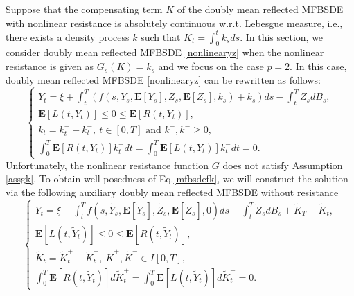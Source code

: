 \documentclass[10pt]{article}%
\numberwithin{equation}{section}
\begin{document}
Suppose that the compensating term $K$ of the doubly mean reflected MFBSDE with nonlinear resistance is absolutely continuous w.r.t. Lebesgue measure, i.e., there exists a density process $k$ such that $K_t=\int_0^t k_sds$. In this section, we consider doubly mean reflected MFBSDE \eqref{nonlinearyz} when the nonlinear resistance is given as $G_s(K)=k_s$ and we focus on the case $p=2$. In this case, doubly mean reflected MFBSDE \eqref{nonlinearyz} can be rewritten as follows:
\begin{equation}\label{mfbsdefk}
\begin{cases}
Y_t=\xi+\int_t^T \left(f(s,Y_s,\mathbf{E}[Y_s],Z_s,\mathbf{E}[Z_s],k_s)+k_s\right)ds-\int_t^T Z_s dB_s, \\
\mathbf{E}[L(t,Y_t)]\leq 0\leq \mathbf{E}[R(t,Y_t)],\\ 
{k_t=k^+_t-k^-_t, \ t\in[0,T] \textrm{ and }k^+,k^-\geq 0,}\\
\int_0^T \mathbf{E}[R(t,Y_t)]k_t^+dt=\int_0^T \mathbf{E}[L(t,Y_t)]k^-_tdt=0.
\end{cases}
\end{equation}
Unfortunately, the nonlinear resistance function $G$ does not satisfy Assumption \ref{assgk}. To obtain well-posedness of Eq.\eqref{mfbsdefk}, we will construct the solution via the following auxiliary doubly mean reflected MFBSDE without resistance
\begin{equation}\label{aumdrmfbsdewr}
\begin{cases}
\widetilde{Y}_t=\xi+\int_t^T f(s,\widetilde{Y}_s,\mathbf{E}[\widetilde{Y}_s],\widetilde{Z}_s,\mathbf{E}[\widetilde{Z}_s],0)ds-\int_t^T\widetilde{Z}_s dB_s+\widetilde{K}_T-\widetilde{K}_t, \\
\mathbf{E}[L(t,\widetilde{Y}_t)]\leq 0\leq \mathbf{E}[R(t,\widetilde{Y}_t)],\\ 
\widetilde{K}_t=\widetilde{K}^{+}_t-\widetilde{K}^{-}_t,\ \widetilde{K}^+,\widetilde{K}^{-} \in I[0,T],\\
\int_0^T \mathbf{E}[R(t,\widetilde{Y}_t)]d\widetilde{K}_t^+=\int_0^T \mathbf{E}[L(t,\widetilde{Y}_t)]d\widetilde{K}^-_t=0.
\end{cases}
\end{equation}
\end{document}
